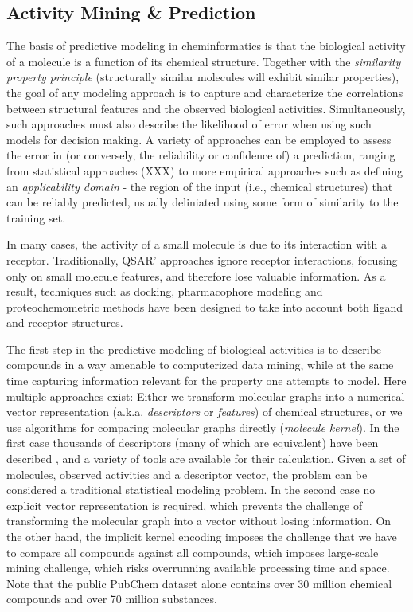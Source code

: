 \documentclass{sig-alternate}
\begin{document}
\subsection{Activity Mining \& Prediction}
\label{sec:activity-mining}


The basis of predictive modeling in cheminformatics is that the
biological activity of a molecule is a function of its chemical
structure. Together with the \emph{similarity property principle}
\cite{Johnson:1990ys} (structurally similar molecules will exhibit
similar properties), the goal of any modeling approach is to capture
and characterize the correlations between structural features and the
observed biological activities. Simultaneously, such approaches must
also describe the likelihood of error when using such
models for decision making.  A variety of approaches can be employed
to assess the error in (or conversely, the reliability or confidence of) a
prediction, ranging from statistical approaches (XXX) to more
empirical approaches such as defining an \emph{applicability domain} -
the region of the input (i.e., chemical structures) that can be
reliably predicted, usually deliniated using some form of similarity
to the training set.

In many cases, the activity of a small molecule is due to its
interaction with a receptor. Traditionally,  QSAR' \cite{Hansch:1962vn,
  Free:1964ys} approaches ignore receptor interactions, focusing only
on small molecule features, and therefore lose valuable
information. As a result, techniques such as docking, pharmacophore
modeling and proteochemometric methods have been designed to take into
account both ligand and receptor structures.

The first step in the predictive modeling of biological activities is
to describe compounds in a way amenable to computerized data mining, while at the same time capturing information
relevant for the property one attempts to model. Here multiple approaches exist: Either we transform molecular graphs
into a
numerical vector representation (a.k.a. \emph{descriptors} or
\emph{features}) of chemical structures, or we use algorithms for
comparing molecular graphs directly (\emph{molecule kernel}). In the
first case thousands of descriptors (many of which are equivalent)
have been described \cite{todeschini2000},
and a variety of tools are available for their calculation. Given a
set of molecules, observed activities and a descriptor vector, the
problem can be considered a traditional statistical modeling
problem. In the second case no explicit vector representation is
required, which prevents the challenge of transforming the molecular
graph into a vector without losing information. On the other hand, the
implicit kernel encoding imposes the challenge that we have to compare all compounds against
all compounds, which imposes large-scale mining challenge, which risks overrunning available
processing time and space. Note that the public PubChem dataset alone
contains over 30 million chemical compounds and over 70 million substances.
\end{document}
